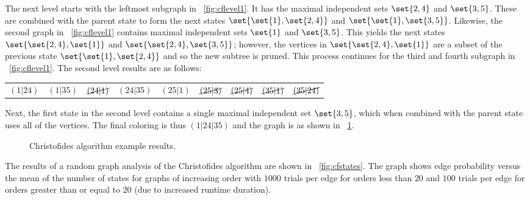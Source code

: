 The next level starts with the leftmost subgraph in \figurename~\ref{fig:cflevel1}.  It has the maximal independent
sets \(\set{2,4}\) and \(\set{3,5}\).  These are combined with the parent state to form the next states
\(\set{\set{1},\set{2,4}}\) and \(\set{\set{1},\set{3,5}}\).  Likewise, the second graph in
\figurename~\ref{fig:cflevel1} contains maximal independent sets \(\set{1}\) and \(\set{3,5}\).  This yields the
next states \(\set{\set{2,4},\set{1}}\) and \(\set{\set{2,4},\set{3,5}}\); however, the vertices in
\(\set{\set{2,4},\set{1}}\) are a subset of the previous state \(\set{\set{1},\set{2,4}}\) and so the new subtree
is pruned.  This process continues for the third and fourth subgraph in \figurename~\ref{fig:cflevel1}.  The second
level results are as follows:

\begin{tabular}{ccccccccc}
  \((1|24)\) & \((1|35)\) & \(\cancel{(24|1)}\) & \((24|35)\) & \((25|1)\) & \(\cancel{(25|3)}\) &
  \(\cancel{(25|4)}\) & \(\cancel{(35|1)}\) & \(\cancel{(35|24)}\)
\end{tabular}

Next, the first state in the second level contains a single maximal independent set \(\set{3,5}\), which when
combined with the parent state uses all of the vertices.  The final coloring is thus \((1|24|35)\) and the graph is
 as shown in \figurename~\ref{fig:cfresults}.

\begin{figure}[H]
  \centering
  \caption{Christofides algorithm example results.}
  \label{fig:cfresults}
\end{figure}

The results of a random graph analysis of the Christofides algorithm are shown in \figurename~\ref{fig:cfstates}.
The graph shows edge probability versus the mean of the number of states for graphs of increasing order with
\(1000\) trials per edge for orders less than \(20\) and \(100\) trials per edge for orders greater than or equal
to \(20\) (due to increased runtime duration).

